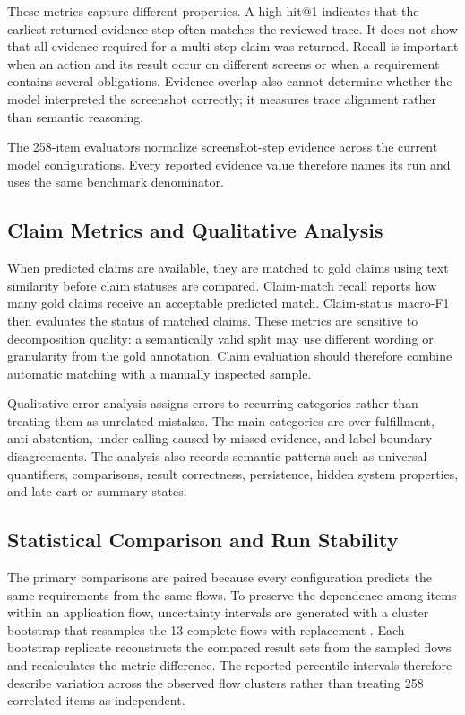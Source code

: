 These metrics capture different properties. A high hit@1 indicates that the
earliest returned evidence step often matches the reviewed trace. It does not
show that all evidence required for a multi-step claim was returned. Recall is
important when an action and its result occur on different screens or when a
requirement contains several obligations. Evidence overlap also cannot
determine whether the model interpreted the screenshot correctly; it measures
trace alignment rather than semantic reasoning.

The 258-item evaluators normalize screenshot-step evidence across the current
model configurations. Every reported evidence value therefore names its run
and uses the same benchmark denominator.

\subsection{Claim Metrics and Qualitative Analysis}\label{claim-metrics-and-qualitative-analysis}

When predicted claims are available, they are matched to gold claims using text similarity before claim statuses are compared. Claim-match recall reports how many gold claims receive an acceptable predicted match. Claim-status macro-F1 then evaluates the status of matched claims. These metrics are sensitive to decomposition quality: a semantically valid split may use different wording or granularity from the gold annotation. Claim evaluation should therefore combine automatic matching with a manually inspected sample.

Qualitative error analysis assigns errors to recurring categories rather than treating them as unrelated mistakes. The main categories are over-fulfillment, anti-abstention, under-calling caused by missed evidence, and label-boundary disagreements. The analysis also records semantic patterns such as universal quantifiers, comparisons, result correctness, persistence, hidden system properties, and late cart or summary states.

\subsection{Statistical Comparison and Run Stability}\label{statistical-comparison-and-run-stability}

The primary comparisons are paired because every configuration predicts the
same requirements from the same flows. To preserve the dependence among items
within an application flow, uncertainty intervals are generated with a cluster
bootstrap that resamples the 13 complete flows with replacement
\autocite{fieldwelsh2007}. Each bootstrap replicate reconstructs
the compared result sets from the sampled flows and recalculates the metric
difference. The reported percentile intervals therefore describe variation
across the observed flow clusters rather than treating 258 correlated items as
independent.

